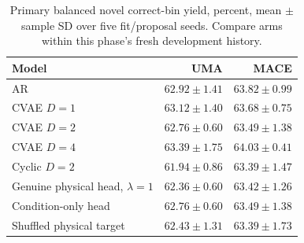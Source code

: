 \begin{table}[htbp]
\centering\small
\caption{Primary balanced novel correct-bin yield, percent, mean $\pm$ sample SD over five fit/proposal seeds. Compare arms within this phase's fresh development history.}
\begin{tabular}{lrr}\toprule
Model & UMA & MACE\\\midrule
AR & $62.92\pm1.41$ & $63.82\pm0.99$\\
CVAE $D=1$ & $63.12\pm1.40$ & $63.68\pm0.75$\\
CVAE $D=2$ & $62.76\pm0.60$ & $63.49\pm1.38$\\
CVAE $D=4$ & $63.39\pm1.75$ & $64.03\pm0.41$\\
Cyclic $D=2$ & $61.94\pm0.86$ & $63.39\pm1.47$\\
Genuine physical head, $\lambda=1$ & $62.36\pm0.60$ & $63.42\pm1.26$\\
Condition-only head & $62.76\pm0.60$ & $63.49\pm1.38$\\
Shuffled physical target & $62.43\pm1.31$ & $63.39\pm1.73$\\
\bottomrule\end{tabular}
\end{table}
